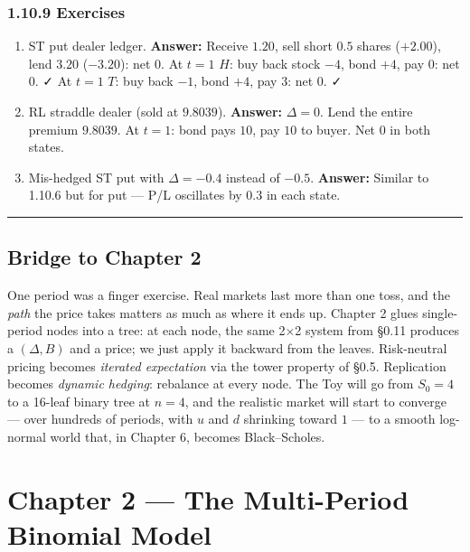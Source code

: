 \documentclass[
  10pt,
  twoside]{book}
\providecommand{\tightlist}{%
  \setlength{\itemsep}{0pt}\setlength{\parskip}{0pt}}
\begin{document}
\subsection{1.10.9 Exercises}\label{exercises-20}

\begin{enumerate}
\def\labelenumi{\arabic{enumi}.}
\tightlist
\item
  ST put dealer ledger. \textbf{Answer:} Receive \(1.20\), sell short
  \(0.5\) shares (\(+2.00\)), lend \(3.20\) (\(-3.20\)): net \(0\). At
  \(t=1\) \(H\): buy back stock \(-4\), bond \(+4\), pay \(0\): net
  \(0\). ✓ At \(t=1\) \(T\): buy back \(-1\), bond \(+4\), pay \(3\):
  net \(0\). ✓
\item
  RL straddle dealer (sold at \(9.8039\)). \textbf{Answer:}
  \(\Delta=0\). Lend the entire premium \(9.8039\). At \(t=1\): bond
  pays \(10\), pay \(10\) to buyer. Net \(0\) in both states.
\item
  Mis-hedged ST put with \(\Delta=-0.4\) instead of \(-0.5\).
  \textbf{Answer:} Similar to 1.10.6 but for put --- P/L oscillates by
  \(0.3\) in each state.
\end{enumerate}

\begin{center}\rule{0.5\linewidth}{0.5pt}\end{center}

\section{Bridge to Chapter 2}\label{bridge-to-chapter-2}

One period was a finger exercise. Real markets last more than one toss,
and the \emph{path} the price takes matters as much as where it ends up.
Chapter 2 glues single-period nodes into a tree: at each node, the same
2×2 system from §0.11 produces a \((\Delta,B)\) and a price; we just
apply it backward from the leaves. Risk-neutral pricing becomes
\emph{iterated expectation} via the tower property of §0.5. Replication
becomes \emph{dynamic hedging}: rebalance at every node. The Toy will go
from \(S_0=4\) to a 16-leaf binary tree at \(n=4\), and the realistic
market will start to converge --- over hundreds of periods, with \(u\)
and \(d\) shrinking toward \(1\) --- to a smooth log-normal world that,
in Chapter 6, becomes Black--Scholes.

\newpage

\chapter{Chapter 2 --- The Multi-Period Binomial
Model}\label{chapter-2-the-multi-period-binomial-model}
\end{document}
